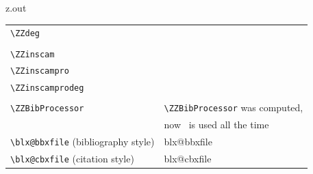 \begin{VerbatimOut}{z.out}
\begin{tabular}{@{}ll@{}}
  \verb+\ZZdeg+& \ZZdeg\\
  \noalign{\vspace*{12pt}}
  \multicolumn{2}{@{}l}{DERIVED (for debugging)\hfil}\\
  \verb+\ZZinscam+& \ZZinscam\\
  \verb+\ZZinscampro+& \ZZinscampro\\
  \verb+\ZZinscamprodeg+& \ZZinscamprodeg\\
  \noalign{\vspace*{12pt}}
  \multicolumn{2}{@{}l}{COMPUTED\hfil}\\
  \verb+\ZZBibProcessor+& \verb+\ZZBibProcessor+ was computed,\\
                        & now \BibLaTeXLogo\ is used all the time\\
  \verb+\blx@bbxfile+ (bibliography style)& \csname blx@bbxfile\endcsname\\
  \verb+\blx@cbxfile+ (citation style)&  \csname blx@cbxfile\endcsname\\
  \bottomrule
\end{tabular}
\end{VerbatimOut}

\MyIO
